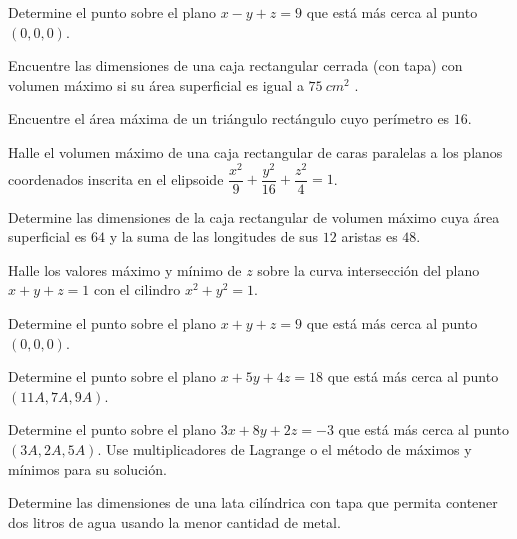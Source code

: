 \begin{prob}
Determine el punto sobre el plano $x-y+z=9$ que está más cerca al punto $(0,0,0)$.
\end{prob}


\begin{prob}
Encuentre las dimensiones de una caja rectangular cerrada (con tapa) con volumen máximo si su área superficial es igual a $75\ cm^2$ .
\end{prob}


\begin{prob}
Encuentre el área máxima de un triángulo rectángulo cuyo perímetro es $16$.
\end{prob}

\begin{prob}
Halle el volumen máximo de una caja rectangular de caras paralelas a los
planos coordenados inscrita en el elipsoide
$\dfrac{x^2}{9}+\dfrac{y^2}{16}+\dfrac{z^2}{4}=1$.
\end{prob}

\begin{prob}
Determine las dimensiones de la caja rectangular de volumen máximo cuya área
superficial es $64$ y la suma de las longitudes de sus $12$ aristas es $48$.
\end{prob}

\begin{prob}
Halle los valores máximo y mínimo de $z$ sobre la curva intersección del plano
$x+y+z=1$ con el cilindro $x^2+y^2=1$.
\end{prob}

\begin{prob}
Determine el punto sobre el plano $x+y+z=9$ que está más cerca al punto $(0,0,0).$
\end{prob}


\begin{prob}
Determine el punto sobre el plano $x+5y+4z=18$ que está más cerca al punto $(11A,7A,9A).$
\end{prob}


\begin{prob}
Determine el punto sobre el plano $3x+8y+2z=-3$ que está más cerca al punto $(3A,2A,5A).$ Use multiplicadores de Lagrange o el método de máximos y mínimos para su solución.
\end{prob}

\begin{prob}
Determine las dimensiones de una lata cilíndrica con tapa que permita contener dos litros de agua usando la menor cantidad de metal.
\end{prob}


